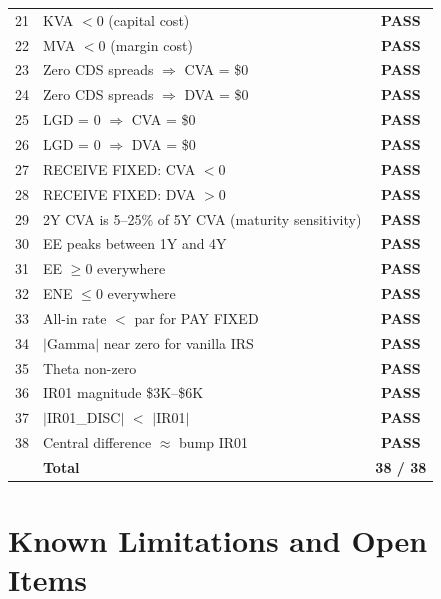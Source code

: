\documentclass[11pt,a4paper]{article}
\newcommand{\pass}{\textbf{\color{passteal}PASS}}
\begin{document}
\begin{longtable}{llc}
21 & KVA $< 0$ (capital cost)                            & \pass \\
22 & MVA $< 0$ (margin cost)                             & \pass \\
23 & Zero CDS spreads $\Rightarrow$ CVA = \$0            & \pass \\
24 & Zero CDS spreads $\Rightarrow$ DVA = \$0            & \pass \\
25 & LGD = 0 $\Rightarrow$ CVA = \$0                     & \pass \\
26 & LGD = 0 $\Rightarrow$ DVA = \$0                     & \pass \\
27 & RECEIVE FIXED: CVA $< 0$                            & \pass \\
28 & RECEIVE FIXED: DVA $> 0$                            & \pass \\
29 & 2Y CVA is 5--25\% of 5Y CVA (maturity sensitivity)  & \pass \\
30 & EE peaks between 1Y and 4Y                          & \pass \\
31 & EE $\geq 0$ everywhere                              & \pass \\
32 & ENE $\leq 0$ everywhere                             & \pass \\
33 & All-in rate $<$ par for PAY FIXED                   & \pass \\
\midrule
34 & $|$Gamma$|$ near zero for vanilla IRS               & \pass \\
35 & Theta non-zero                                      & \pass \\
36 & IR01 magnitude \$3K--\$6K                           & \pass \\
37 & $|$IR01\_DISC$|$ $<$ $|$IR01$|$                     & \pass \\
38 & Central difference $\approx$ bump IR01              & \pass \\
\midrule
   & \textbf{Total} & \textbf{\color{passteal}38 / 38} \\
\end{longtable}

\section{Known Limitations and Open Items}
\end{document}
